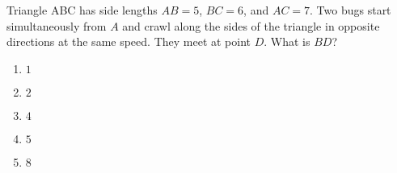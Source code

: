 Triangle ABC has side lengths $AB=5$, $BC=6$, and $AC=7$. Two bugs start simultaneously from $A$ and crawl along the sides of the triangle in opposite directions at the same speed. They meet at point $D$. What is $BD$?

\begin{enumerate}
\item $1$
\item $2$
\item $4$
\item $5$
\item $8$
\end{enumerate}
